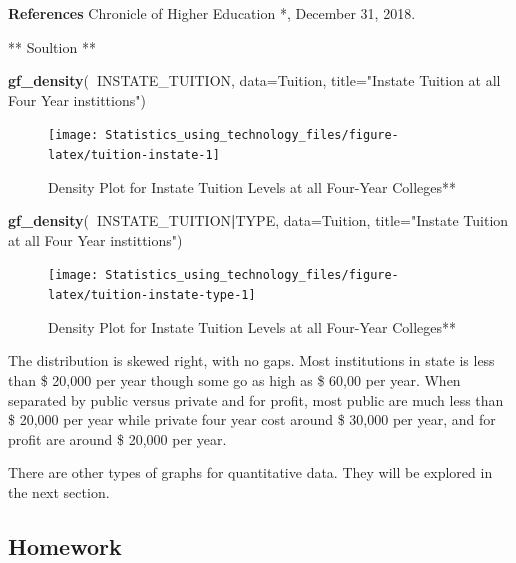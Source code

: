 \documentclass[
]{book}
\newenvironment{Shaded}{\begin{snugshade}}{\end{snugshade}}
\newcommand{\DataTypeTok}[1]{\textcolor[rgb]{0.13,0.29,0.53}{#1}}
\newcommand{\KeywordTok}[1]{\textcolor[rgb]{0.13,0.29,0.53}{\textbf{#1}}}
\newcommand{\NormalTok}[1]{#1}
\newcommand{\OperatorTok}[1]{\textcolor[rgb]{0.81,0.36,0.00}{\textbf{#1}}}
\newcommand{\StringTok}[1]{\textcolor[rgb]{0.31,0.60,0.02}{#1}}
\begin{document}
\textbf{References}
Chronicle of Higher Education *, December 31, 2018.

** Soultion **



\begin{Shaded}
\begin{Highlighting}[]
\KeywordTok{gf_density}\NormalTok{(}\OperatorTok{~}\NormalTok{INSTATE_TUITION, }\DataTypeTok{data=}\NormalTok{Tuition, }
           \DataTypeTok{title=}\StringTok{"Instate Tuition at all Four Year instittions"}\NormalTok{)}
\end{Highlighting}
\end{Shaded}

\begin{figure}
\texttt{[image: Statistics\_using\_technology\_files/figure-latex/tuition-instate-1]} \caption{Density Plot for Instate Tuition Levels at all Four-Year Colleges**}\label{fig:tuition-instate}
\end{figure}



\begin{Shaded}
\begin{Highlighting}[]
\KeywordTok{gf_density}\NormalTok{(}\OperatorTok{~}\NormalTok{INSTATE_TUITION}\OperatorTok{|}\NormalTok{TYPE, }\DataTypeTok{data=}\NormalTok{Tuition, }
           \DataTypeTok{title=}\StringTok{"Instate Tuition at all Four Year instittions"}\NormalTok{)}
\end{Highlighting}
\end{Shaded}

\begin{figure}
\texttt{[image: Statistics\_using\_technology\_files/figure-latex/tuition-instate-type-1]} \caption{Density Plot for Instate Tuition Levels at all Four-Year Colleges**}\label{fig:tuition-instate-type}
\end{figure}

The distribution is skewed right, with no gaps. Most institutions in state is less than \$ 20,000 per year though some go as high as \$ 60,00 per year. When separated by public versus private and for profit, most public are much less than \$ 20,000 per year while private four year cost around \$ 30,000 per year, and for profit are around \$ 20,000 per year.

There are other types of graphs for quantitative data. They will be explored in the next section.

\hypertarget{homework-1}{%
\subsection{Homework}\label{homework-1}}
\end{document}
